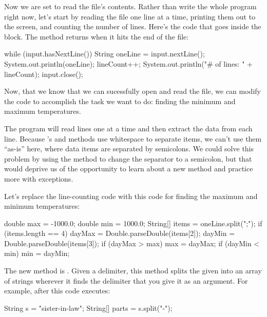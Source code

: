 Now we are set to read the file's contents. Rather than write the whole program right now, let's start by reading the file one line at a time, printing them out to the screen, and counting the number of lines. Here's the code that goes inside the  block. The  method returns  when it hits the end of the file:

\begin{code}
            while (input.hasNextLine()) {
                String oneLine = input.nextLine();
                System.out.println(oneLine);
                lineCount++;
            }
            System.out.println("# of lines: " + lineCount);
            input.close();
\end{code}

Now, that we know that we can sucessfully open and read the file, we can modify the code to accomplish the task we want to do: finding the minimum and maximum temperatures.

The program will read lines one at a time and then extract the data from each line. Because 's  and  methods use whitespace to separate items, we can't use them ``as-is'' here, where data items are separated by semicolons. We could solve this problem by using the  method to change the separator to a semicolon, but that would deprive us of the opportunity to learn about a new  method and practice more with exceptions.

Let's replace the line-counting code with this code for finding the maximum and minimum temperatures:

\begin{code}
double max = -1000.0;
double min = 1000.0;
String[] items = oneLine.split(";");
if (items.length == 4) {
    dayMax = Double.parseDouble(items[2]);
    dayMin = Double.parseDouble(items[3]);
    if (dayMax > max) {
        max = dayMax;
    }
    if (dayMin < min) {
        min = dayMin;
    }
}
\end{code}

The new  method is . Given a delimiter, this method splits the given  into an array of strings wherever it finds the delimiter that you give it as an argument. For example, after this code executes:

\begin{code}
String s = "sister-in-law";
String[] parts = s.split("-");
\end{code}

